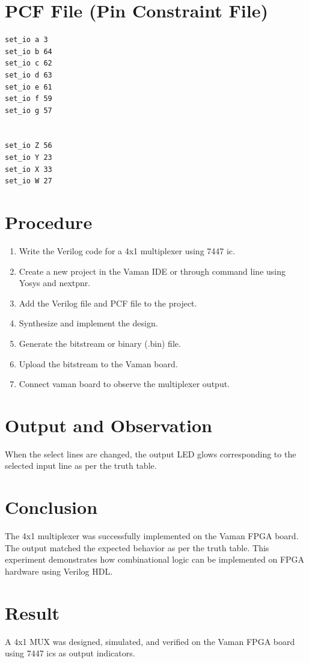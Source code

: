 \documentclass[a4paper,12pt]{article}
\begin{document}
\section*{PCF File (Pin Constraint File)}
\begin{lstlisting}[style=verilog, caption={.pcf File for Vaman Board Pin Mapping}]
set_io a 3
set_io b 64
set_io c 62
set_io d 63
set_io e 61
set_io f 59
set_io g 57


set_io Z 56
set_io Y 23
set_io X 33
set_io W 27
\end{lstlisting}

\section*{Procedure}
\begin{enumerate}
    \item Write the Verilog code for a 4x1 multiplexer using  7447 ic.
    \item Create a new project in the Vaman IDE or through command line using Yosys and nextpnr.
    \item Add the Verilog file and PCF file to the project.
    \item Synthesize and implement the design.
    \item Generate the bitstream or binary (.bin) file.
    \item Upload the bitstream to the Vaman board.
    \item Connect vaman board to observe the multiplexer output.
\end{enumerate}

\section*{Output and Observation}
When the select lines are changed, the output LED glows corresponding to the selected input line as per the truth table.

\section*{Conclusion}
The 4x1 multiplexer was successfully implemented on the Vaman FPGA board. The output matched the expected behavior as per the truth table. This experiment demonstrates how combinational logic can be implemented on FPGA hardware using Verilog HDL.

\section*{Result}
A 4x1 MUX was designed, simulated, and verified on the Vaman FPGA board using 7447 ics as output indicators.
\end{document}
